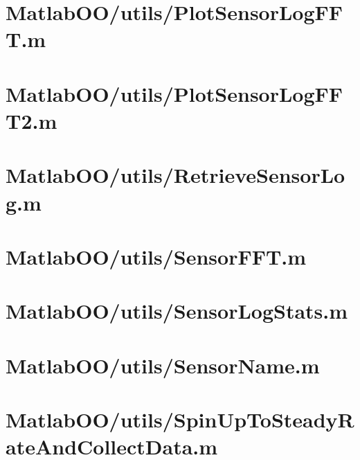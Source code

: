 \pagebreak
\section{MatlabOO/utils/PlotSensorLogFFT.m}\label{code:MatlabOO/utils/PlotSensorLogFFT.m}


\pagebreak
\section{MatlabOO/utils/PlotSensorLogFFT2.m}\label{code:MatlabOO/utils/PlotSensorLogFFT2.m}


\pagebreak
\section{MatlabOO/utils/RetrieveSensorLog.m}\label{code:MatlabOO/utils/RetrieveSensorLog.m}


\pagebreak
\section{MatlabOO/utils/SensorFFT.m}\label{code:MatlabOO/utils/SensorFFT.m}


\pagebreak
\section{MatlabOO/utils/SensorLogStats.m}\label{code:MatlabOO/utils/SensorLogStats.m}


\pagebreak
\section{MatlabOO/utils/SensorName.m}\label{code:MatlabOO/utils/SensorName.m}


\pagebreak
\section{MatlabOO/utils/SpinUpToSteadyRateAndCollectData.m}\label{code:MatlabOO/utils/SpinUpToSteadyRateAndCollectData.m}


